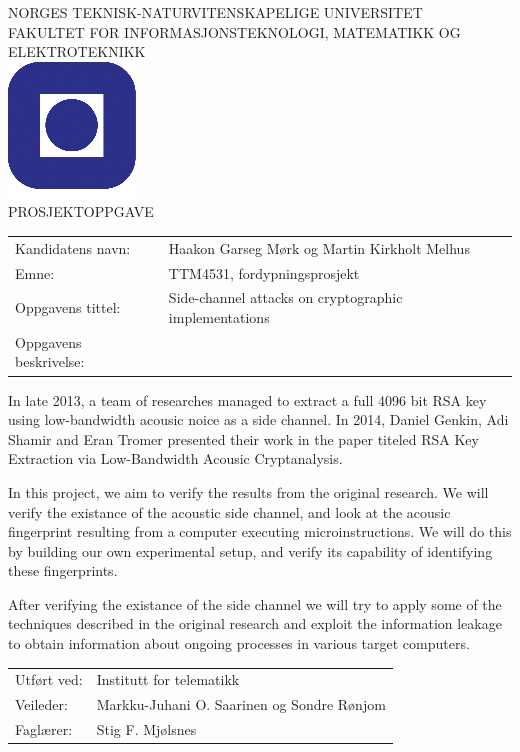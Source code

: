 \documentclass[a4paper,11pt]{article}
\begin{document}
\sffamily
\begin{titlepage}
\begin{center}
\textsc{NORGES TEKNISK-NATURVITENSKAPELIGE UNIVERSITET\\
FAKULTET FOR INFORMASJONSTEKNOLOGI, MATEMATIKK OG ELEKTROTEKNIKK} \\
\vspace{0.5cm} 
\includegraphics[scale=0.5]{NTNU-logo} \\
\vspace{1.0cm}
{\Huge{PROSJEKTOPPGAVE}}
\vspace{1.0cm}
\end{center}

\begin{tabular}{@{}p{5cm}l}
Kandidatens navn:	& Haakon Garseg Mørk og Martin Kirkholt Melhus\\
Emne:			& TTM4531, fordypningsprosjekt\\
Oppgavens tittel: 	& Side-channel attacks on cryptographic implementations \\
Oppgavens beskrivelse: 	& \\
\end{tabular}

In late 2013, a team of researches managed to extract a full 4096 bit RSA key using low-bandwidth acousic noice as a side channel. In 2014, Daniel Genkin, Adi Shamir and Eran Tromer presented their work in the paper titeled RSA Key Extraction via Low-Bandwidth Acousic Cryptanalysis.

In this project, we aim to verify the results from the original research. We will verify the existance of the acoustic side channel, and look at the acousic fingerprint resulting from a computer executing microinstructions. We will do this by building our own experimental setup, and verify its capability of identifying these fingerprints. 

After verifying the existance of the side channel we will try to apply some of the techniques described in the original research and exploit the information leakage to obtain information about ongoing processes in various target computers.

\begin{tabular}{@{}p{5cm}l}
Utf\o{}rt ved:	& Institutt for telematikk \\
Veileder:	& Markku-Juhani O. Saarinen og Sondre Rønjom \\
Fagl\ae{}rer: 	& Stig F. Mjølsnes \\
\end{tabular}

\end{titlepage}
\end{document}
